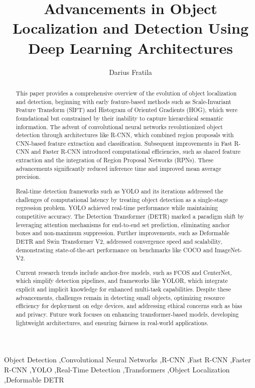 \documentclass[3p,times]{elsarticle}
\begin{document}
    
\begin{frontmatter}


\title{Advancements in Object Localization and Detection Using Deep Learning Architectures}

\author{Darius Fratila} 

\address{Department of Computer Science, Babe\c s-Bolyai University\\1, M. Kogalniceanu Street, 400084, Cluj-Napoca, Romania\\E-mail: darius.fratila@stud.ubbcluj.ro}

\begin{abstract}
This paper provides a comprehensive overview of the evolution of object localization and detection, beginning with early feature-based methods such as Scale-Invariant Feature Transform (SIFT) and Histogram of Oriented Gradients (HOG), which were foundational but constrained by their inability to capture hierarchical semantic information. The advent of convolutional neural networks revolutionized object detection through architectures like R-CNN, which combined region proposals with CNN-based feature extraction and classification. Subsequent improvements in Fast R-CNN and Faster R-CNN introduced computational efficiencies, such as shared feature extraction and the integration of Region Proposal Networks (RPNs). These advancements significantly reduced inference time and improved mean average precision.  

Real-time detection frameworks such as YOLO and its iterations addressed the challenges of computational latency by treating object detection as a single-stage regression problem. YOLO achieved real-time performance while maintaining competitive accuracy. The Detection Transformer (DETR) marked a paradigm shift by leveraging attention mechanisms for end-to-end set prediction, eliminating anchor boxes and non-maximum suppression. Further improvements, such as Deformable DETR and Swin Transformer V2, addressed convergence speed and scalability, demonstrating state-of-the-art performance on benchmarks like COCO and ImageNet-V2.

Current research trends include anchor-free models, such as FCOS and CenterNet, which simplify detection pipelines, and frameworks like YOLOR, which integrate explicit and implicit knowledge for enhanced multi-task capabilities. Despite these advancements, challenges remain in detecting small objects, optimizing resource efficiency for deployment on edge devices, and addressing ethical concerns such as bias and privacy. Future work focuses on enhancing transformer-based models, developing lightweight architectures, and ensuring fairness in real-world applications.
\end{abstract}

\begin{keyword} 
Object Detection \sep Convolutional Neural Networks \sep R-CNN \sep Fast R-CNN \sep Faster R-CNN \sep YOLO \sep Real-Time Detection \sep Transformers \sep Object Localization \sep Deformable DETR
\end{keyword}

\end{frontmatter}
\end{document}
